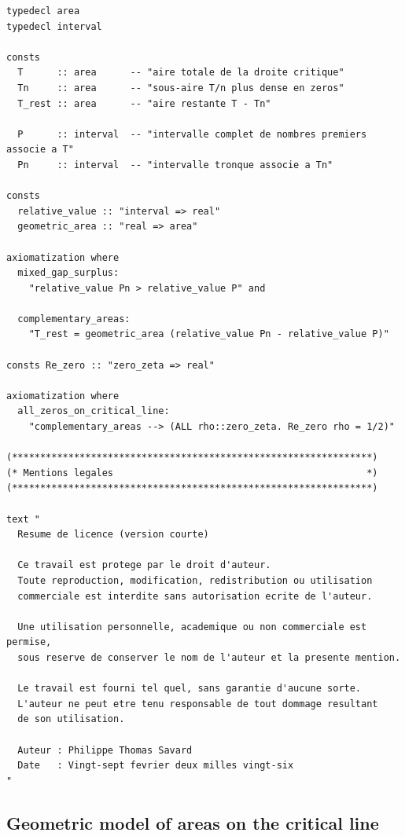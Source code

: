 \documentclass[a4paper,11pt]{article}
\begin{document}
\begin{holcode}[title={\textcolor{white}{File: methode\_spectral.thy -- Part 6/6 (END)}}]
\begin{lstlisting}
typedecl area
typedecl interval

consts
  T      :: area      -- "aire totale de la droite critique"
  Tn     :: area      -- "sous-aire T/n plus dense en zeros"
  T_rest :: area      -- "aire restante T - Tn"

  P      :: interval  -- "intervalle complet de nombres premiers associe a T"
  Pn     :: interval  -- "intervalle tronque associe a Tn"

consts
  relative_value :: "interval => real"
  geometric_area :: "real => area"

axiomatization where
  mixed_gap_surplus:
    "relative_value Pn > relative_value P" and

  complementary_areas:
    "T_rest = geometric_area (relative_value Pn - relative_value P)"

consts Re_zero :: "zero_zeta => real"

axiomatization where
  all_zeros_on_critical_line:
    "complementary_areas --> (ALL rho::zero_zeta. Re_zero rho = 1/2)"

(****************************************************************)
(* Mentions legales                                             *)
(****************************************************************)

text "
  Resume de licence (version courte)

  Ce travail est protege par le droit d'auteur.
  Toute reproduction, modification, redistribution ou utilisation
  commerciale est interdite sans autorisation ecrite de l'auteur.

  Une utilisation personnelle, academique ou non commerciale est permise,
  sous reserve de conserver le nom de l'auteur et la presente mention.

  Le travail est fourni tel quel, sans garantie d'aucune sorte.
  L'auteur ne peut etre tenu responsable de tout dommage resultant
  de son utilisation.

  Auteur : Philippe Thomas Savard
  Date   : Vingt-sept fevrier deux milles vingt-six
"
\end{lstlisting}
\end{holcode}


\subsection*{Geometric model of areas on the critical line}
\end{document}
